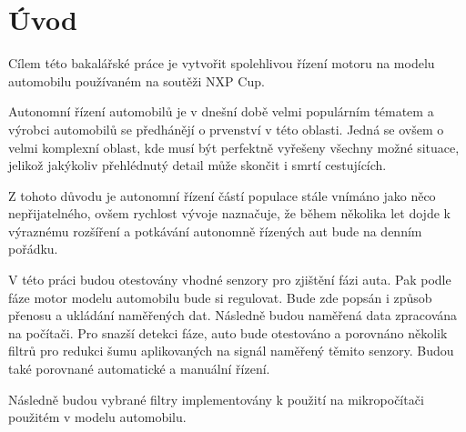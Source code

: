\chapter{Úvod}
\label{sec:Introduction}
Cílem této bakalářské práce je vytvořit spolehlivou řízení motoru na modelu
automobilu používaném na soutěži NXP Cup.

Autonomní řízení automobilů je v dnešní době velmi populárním tématem a výrobci automobilů
se předhánějí o prvenství v této oblasti. Jedná se ovšem o velmi komplexní oblast, kde
musí být perfektně vyřešeny všechny možné situace, jelikož jakýkoliv přehlédnutý detail může
skončit i smrtí cestujících.

Z tohoto důvodu je autonomní řízení částí populace stále vnímáno jako něco nepřijatelného,
ovšem rychlost vývoje naznačuje, že během několika let dojde k výraznému rozšíření a potkávání
autonomně řízených aut bude na denním pořádku.

V této práci budou otestovány vhodné senzory pro zjištění fázi auta. Pak podle fáze motor modelu automobilu bude si regulovat. 
Bude zde popsán i způsob přenosu a ukládání naměřených dat. Následně budou naměřená data zpracována na počítači. 
Pro snazší detekci fáze, auto bude otestováno a porovnáno několik filtrů pro redukci šumu aplikovaných na signál naměřený těmito senzory.
Budou také porovnané automatické a manuální řízení.

Následně budou vybrané filtry implementovány k použití na mikropočítači použitém v modelu automobilu.
\endinput
